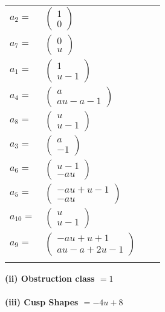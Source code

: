 \documentclass[1p]{elsarticle_modified}
\theoremstyle{definition}
\begin{document}
\begin{tabular}{m{7pt} m{180pt} m{7pt} m{180pt} }
\flushright $a_{2}=$&$\begin{pmatrix}1\\0\end{pmatrix}$ \\
\flushright $a_{7}=$&$\begin{pmatrix}0\\u\end{pmatrix}$ \\
\flushright $a_{1}=$&$\begin{pmatrix}1\\u-1\end{pmatrix}$ \\
\flushright $a_{4}=$&$\begin{pmatrix}a\\a u- a-1\end{pmatrix}$ \\
\flushright $a_{8}=$&$\begin{pmatrix}u\\u-1\end{pmatrix}$ \\
\flushright $a_{3}=$&$\begin{pmatrix}a\\-1\end{pmatrix}$ \\
\flushright $a_{6}=$&$\begin{pmatrix}u-1\\- a u\end{pmatrix}$ \\
\flushright $a_{5}=$&$\begin{pmatrix}- a u+u-1\\- a u\end{pmatrix}$ \\
\flushright $a_{10}=$&$\begin{pmatrix}u\\u-1\end{pmatrix}$ \\
\flushright $a_{9}=$&$\begin{pmatrix}- a u+u+1\\a u- a+2 u-1\end{pmatrix}$\\&\end{tabular}
\flushleft \textbf{(ii) Obstruction class $= 1$}\\~\\
\flushleft \textbf{(iii) Cusp Shapes $= -4 u+8$}\\~\\
\end{document}
